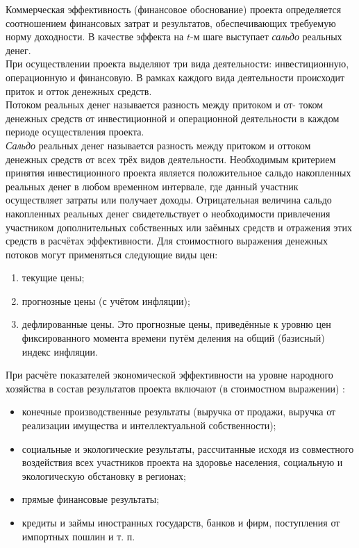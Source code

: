 \documentclass[a4paper,12pt]{article}
\begin{document}
Коммерческая эффективность (финансовое обоснование) проекта
определяется соотношением финансовых затрат и результатов, обеспечивающих требуемую норму доходности. В качестве эффекта на ${t}$-м шаге
выступает \textit{сальдо} реальных денег.\\
При осуществлении проекта выделяют три вида деятельности: инвестиционную, операционную и финансовую. В рамках каждого вида деятельности происходит приток и отток денежных средств.\\
Потоком реальных денег называется разность между притоком и от-
током денежных средств от инвестиционной и операционной деятельности в каждом периоде осуществления проекта.\\
\textit{Сальдо} реальных денег называется разность между притоком и оттоком денежных средств от всех трёх видов деятельности.
Необходимым критерием принятия инвестиционного проекта является положительное сальдо накопленных реальных денег в любом временном интервале, где данный участник осуществляет затраты или получает доходы. Отрицательная величина сальдо накопленных реальных денег свидетельствует о необходимости привлечения участником дополнительных собственных или заёмных средств и отражения этих средств в расчётах эффективности.
\newpage
Для стоимостного выражения денежных потоков могут применяться
следующие виды цен:
\begin{flushleft}
				\begin{enumerate}
					\item текущие цены;
					\item прогнозные цены (с учётом инфляции);
					\item дефлированные цены. Это прогнозные цены, приведённые 						к уровню цен фиксированного момента времени путём 								деления на общий (базисный) индекс инфляции.
				\end{enumerate}
\end{flushleft}
При расчёте показателей экономической эффективности на уровне
народного хозяйства в состав результатов проекта включают (в стоимостном выражении) :
\begin{itemize}
\item конечные производственные результаты (выручка от продажи,
выручка от реализации имущества и интеллектуальной собственности);
\item социальные и экологические результаты, рассчитанные исходя
из совместного воздействия всех участников проекта на здоровье населения, социальную и экологическую обстановку в регионах;
\item прямые финансовые результаты;
\item кредиты и займы иностранных государств, банков и фирм, поступления от импортных пошлин и т. п.
\end{itemize} 
\end{document}

